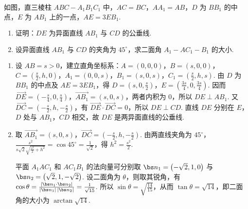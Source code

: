 \begin{problem}
如图，直三棱柱 \(ABC - A_{1}B_{1}C_{1}\) 中，\(AC = BC\)，\(AA_{1} = AB\)，\(D\) 为 \(BB_{1}\) 的中点，\(E\) 为 \(AB_{1}\) 上的一点，\(AE = 3EB_{1}\).

\begin{enumerate}
\item 证明：\(DE\) 为异面直线 \(AB_{1}\) 与 \(CD\) 的公垂线.
\item 设异面直线 \(AB_{1}\) 与 \(CD\) 的夹角为 \(45^{\circ}\)，求二面角 \(A_{1}-AC_{1}-B_{1}\) 的大小.
\end{enumerate}

\end{problem}

\begin{solution}
\begin{enumerate}
\item 设 \(AB=s>0\)，建立直角坐标系：\(A=(0,0,0)\)，\(B=(s,0,0)\)，\(C=\left(\frac{s}{2},h,0\right)\)，\(A_1=(0,0,s)\)，\(B_1=(s,0,s)\)，\(C_1=\left(\frac{s}{2},h,s\right)\). 由 \(D\) 为 \(BB_1\) 的中点及 \(AE=3EB_1\)，得 \(D=\left(s,0,\frac{s}{2}\right)\)，\(E=\left(\frac{3s}{4},0,\frac{3s}{4}\right)\). 因而 \(\overrightarrow{DE}=\left(-\frac{s}{4},0,\frac{s}{4}\right)\)，\(\overrightarrow{AB_1}=(s,0,s)\)，两者内积为 \(0\)，所以 \(DE\perp AB_1\). 又 \(\overrightarrow{DC}=\left(-\frac{s}{2},h,-\frac{s}{2}\right)\)，有 \(\overrightarrow{DE}\cdot\overrightarrow{DC}=0\)，所以 \(DE\perp CD\). 直线 \(DE\) 分别在 \(E\)，\(D\) 处与 \(AB_1\)，\(CD\) 相交，故 \(DE\) 是两异面直线的公垂线.
\item 取 \(\overrightarrow{AB_1}=(s,0,s)\)，\(\overrightarrow{DC}=\left(-\frac{s}{2},h,-\frac{s}{2}\right)\). 由两直线夹角为 \(45^\circ\)，\(\frac{s^2}{s\sqrt{2}\sqrt{\frac{s^2}{2}+h^2}}=\cos45^\circ=\frac{1}{\sqrt{2}}\)，得 \(h^2=\frac{s^2}{2}\).

平面 \(A_1AC_1\) 和 \(A C_1B_1\) 的法向量可分别取 \(\bs n_1=\left(-\sqrt{2},1,0\right)\) 与 \(\bs n_2=\left(\sqrt{2},1,-\sqrt{2}\right)\). 设二面角为 \(\theta\)，则取其锐角，有 \(\cos\theta=\frac{|\bs n_1\cdot\bs n_2|}{|\bs n_1|\,|\bs n_2|}=\frac{1}{\sqrt{15}}\). 所以 \(\sin\theta=\sqrt{\frac{14}{15}}\)，从而 \(\tan\theta=\sqrt{14}\)，即二面角的大小为 \(\arctan\sqrt{14}\).
\end{enumerate}
\end{solution}

